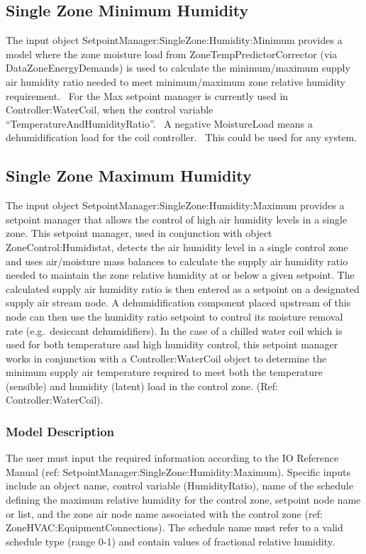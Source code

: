 \subsection{Single Zone Minimum Humidity}\label{single-zone-minimum-humidity}

The input object SetpointManager:SingleZone:Humidity:Minimum provides a model where the zone moisture load from ZoneTempPredictorCorrector (via DataZoneEnergyDemands) is used to calculate the minimum/maximum supply air humidity ratio needed to meet minimum/maximum zone relative humidity requirement.~ For the Max setpoint manager is currently used in Controller:WaterCoil, when the control variable ``TemperatureAndHumidityRatio''.~ A negative MoistureLoad means a dehumidification load for the coil controller.~ This could be used for any system.

\subsection{Single Zone Maximum Humidity}\label{single-zone-maximum-humidity}

The input object SetpointManager:SingleZone:Humidity:Maximum provides a setpoint manager that allows the control of high air humidity levels in a single zone. This setpoint manager, used in conjunction with object ZoneControl:Humidistat, detects the air humidity level in a single control zone and uses air/moisture mass balances to calculate the supply air humidity ratio needed to maintain the zone relative humidity at or below a given setpoint. The calculated supply air humidity ratio is then entered as a setpoint on a designated supply air stream node. A dehumidification component placed upstream of this node can then use the humidity ratio setpoint to control its moisture removal rate (e.g.~desiccant dehumidifiers). In the case of a chilled water coil which is used for both temperature and high humidity control, this setpoint manager works in conjunction with a Controller:WaterCoil object to determine the minimum supply air temperature required to meet both the temperature (sensible) and humidity (latent) load in the control zone. (Ref: Controller:WaterCoil).

\subsubsection{Model Description}\label{model-description-014}

The user must input the required information according to the IO Reference Manual (ref: SetpointManager:SingleZone:Humidity:Maximum). Specific inputs include an object name, control variable (HumidityRatio), name of the schedule defining the maximum relative humidity for the control zone, setpoint node name or list, and the zone air node name associated with the control zone (ref: ZoneHVAC:EquipmentConnections). The schedule name must refer to a valid schedule type (range 0-1) and contain values of fractional relative humidity.

